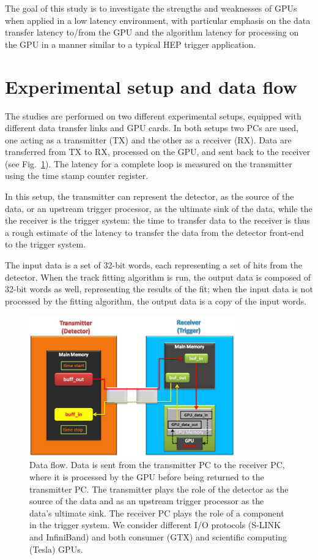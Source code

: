 \documentclass[journal]{IEEEtran}
\begin{document}
The goal of this study is to investigate the strengths and weaknesses of
GPUs when applied in a low latency environment, with particular
emphasis on the data transfer latency to/from the GPU and the
algorithm latency for processing on the GPU in a manner similar to
a typical HEP trigger application.


\section{Experimental setup and data flow}
The studies are performed on two different experimental setups,
equipped with different data transfer links and GPU cards.  In both
setups two PCs are used, one acting as a transmitter (TX) and the other 
as a receiver (RX).  Data are transferred from TX to RX, processed on the GPU, and sent back to the receiver (see
Fig.~\ref{fig_data_flow}).  The latency for a complete loop is measured
on the transmitter using the time stamp counter register.

In this setup, the transmitter can represent the detector, as
the source of the data, or an upstream trigger processor, as
the ultimate sink of the data, while the the receiver is the
trigger system: the time to transfer data to the receiver is thus a
rough estimate of the latency to transfer the data from the detector
front-end to the trigger system.
 
The input data is a set of 32-bit words, each representing a set of
hits from the detector. When the track fitting algorithm is run, the
output data is composed of 32-bit words as well, representing the
results of the fit; when the input data is not processed by the fitting algorithm, the output
data is a copy of the input words.
 
\begin{figure}[!h]
\centering
\includegraphics[width=3.5in]{figures/SetUp-general}
\caption{Data flow. Data is sent from the transmitter PC to the
  receiver PC, where it is processed by the GPU before being returned
  to the transmitter PC. The transmitter plays the role of the
  detector as the source of the data and as an upstream trigger
  processor as the data's ultimate sink. The receiver PC plays the
  role of a component in the trigger system. We consider different I/O
  protocols (S-LINK and InfiniBand) and both consumer (GTX) and scientific computing (Tesla) GPUs. }
\label{fig_data_flow}
\end{figure}
\end{document}
